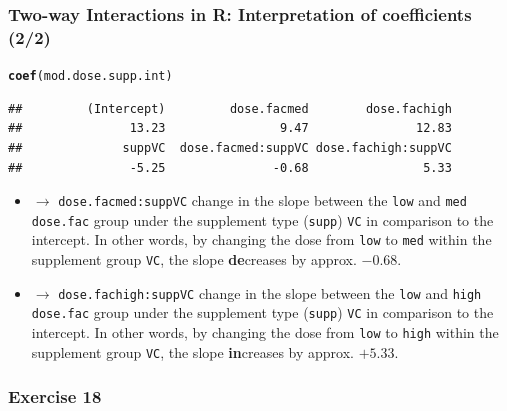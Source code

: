 \documentclass{beamer}\usepackage[]{graphicx}\usepackage[]{color}
\makeatletter
\newcommand{\hlstd}[1]{\textcolor[rgb]{0.345,0.345,0.345}{#1}}%
\newcommand{\hlkwd}[1]{\textcolor[rgb]{0.737,0.353,0.396}{\textbf{#1}}}%
\newenvironment{kframe}{%
 \def\at@end@of@kframe{}%
 \ifinner\ifhmode%
  \def\at@end@of@kframe{\end{minipage}}%
  \begin{minipage}{\columnwidth}%
 \fi\fi%
 \def\FrameCommand##1{\hskip\@totalleftmargin \hskip-\fboxsep
 \colorbox{shadecolor}{##1}\hskip-\fboxsep
     \hskip-\linewidth \hskip-\@totalleftmargin \hskip\columnwidth}%
 \MakeFramed {\advance\hsize-\width
   \@totalleftmargin\z@ \linewidth\hsize
   \@setminipage}}%
 {\par\unskip\endMakeFramed%
 \at@end@of@kframe}
\newenvironment{knitrout}{}{} %
\makeatother
\begin{document}
{{{
\begin{frame}[fragile]
\frametitle{Two-way Interactions in R: Interpretation of coefficients (2/2)}
\begin{knitrout}\tiny
{}\color{fgcolor}\begin{kframe}
\begin{alltt}
\hlkwd{coef}\hlstd{(mod.dose.supp.int)}
\end{alltt}
\begin{verbatim}
##         (Intercept)         dose.facmed        dose.fachigh 
##               13.23                9.47               12.83 
##              suppVC  dose.facmed:suppVC dose.fachigh:suppVC 
##               -5.25               -0.68                5.33
\end{verbatim}
\end{kframe}
\end{knitrout}
\begin{itemize}
\small
\item $\rightarrow$ \texttt{dose.facmed:suppVC} \newline
change in the slope between the \texttt{low} and \texttt{med} \texttt{dose.fac}
group under the supplement type (\texttt{supp}) \texttt{VC} in comparison to the
intercept.
In other words, by changing the dose from \texttt{low} to \texttt{med} within the
supplement group \texttt{VC}, the slope \textbf{de}creases by approx. $-0.68$.
\item $\rightarrow$ \texttt{dose.fachigh:suppVC}  \newline
change in the slope between the \texttt{low} and \texttt{high} \texttt{dose.fac}
group under the supplement type (\texttt{supp}) \texttt{VC} in comparison to the
intercept.
In other words, by changing the dose from \texttt{low} to \texttt{high} within the
supplement group \texttt{VC}, the slope \textbf{in}creases by approx. $+5.33$.
\end{itemize}
\end{frame}


\begin{frame}[fragile]
\frametitle{Exercise 18}
\end{frame}


}}}
\end{document}
